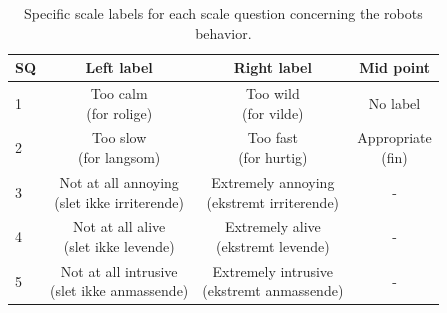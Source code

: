 \begin{table}[H]
	\centering
	\begin{tabular}{l|c|c|c}
		SQ     & Left label & Right label & Mid point \\\hline
		1   & \makecell{Too calm \\(for rolige)} & \makecell{Too wild \\(for vilde)} & No label          \\\hline
		2   & \makecell{Too slow \\(for langsom)} & \makecell{Too fast \\(for hurtig)} & \makecell{Appropriate \\(fin)}         \\\hline
		3   & \makecell{Not at all annoying \\(slet ikke irriterende)} & \makecell{Extremely annoying \\(ekstremt irriterende)} & -         \\\hline
	 	4   & \makecell{Not at all alive \\(slet ikke levende)} & \makecell{Extremely alive \\(ekstremt levende)} & -         \\\hline
		5   & \makecell{Not at all intrusive \\(slet ikke anmassende)} & \makecell{Extremely intrusive \\(ekstremt anmassende)} & -            
	\end{tabular}
	\caption{Specific scale labels for each scale question concerning the robots behavior.}
	\label{tab:BehaviorScale}         
\end{table}
\noindent
%
%
